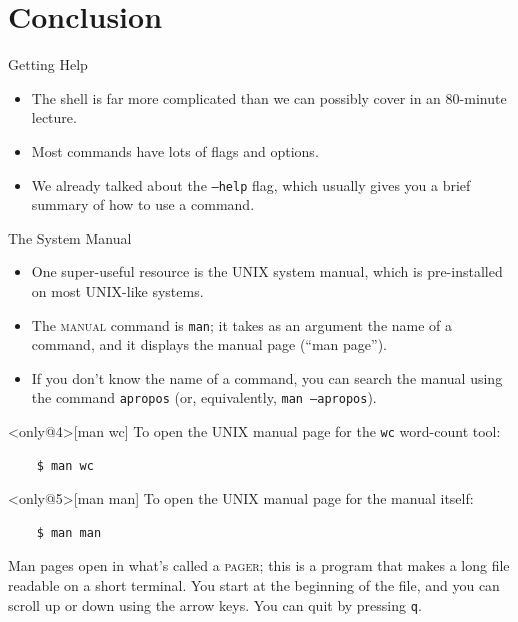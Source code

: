 \section{Conclusion}
\begin{frame}{Getting Help}
  \begin{itemize}
    \item
      The shell is far more complicated than we can possibly cover in an
      80-minute lecture.
      \pause
    \item
      Most commands have lots of flags and options.
      \pause
    \item
      We already talked about the \texttt{--help} flag, which usually gives you
      a brief summary of how to use a command.
  \end{itemize}
\end{frame}

\begin{frame}[fragile]{The System Manual}
  \begin{itemize}
    \item
      One super-useful resource is the UNIX system manual, which is
      pre-installed on most UNIX-like systems.
      \pause
    \item
      \alert<2>{The \textsc{manual} command is \texttt{man}}; it takes as an
      argument the name of a command, and it displays the manual page
      (\enquote{man page}).
      \pause
    \item
      If you don't know the name of a command, you can search the manual using
      the command \texttt{apropos} (or, equivalently, \texttt{man --apropos}).
  \end{itemize}
  \pause
  \begin{example}<only@4>[man wc]
    To open the UNIX manual page for the \texttt{wc} word-count tool:
    \begin{verbatim}
    $ man wc
    \end{verbatim}
  \end{example}
  \pause
  \begin{example}<only@5>[man man]
    To open the UNIX manual page for the manual itself:
    \begin{verbatim}
    $ man man
    \end{verbatim}
  \end{example}
\end{frame}

Man pages open in what's called a \textsc{pager}; this is a program that makes
a long file readable on a short terminal.  You start at the beginning of the
file, and you can scroll up or down using the arrow keys.  You can quit by
pressing \texttt{q}.

